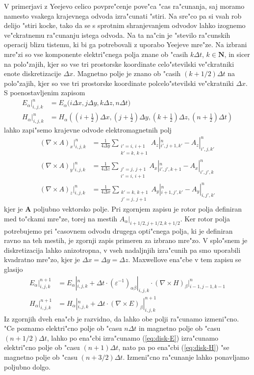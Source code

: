\documentclass[12pt,twoside,openright,final]{report}
\renewcommand{\vec}{\mathbf}
\begin{document}
V primerjavi z Yeejevo celico povpre"cenje pove"ca "cas ra"cunanja, saj moramo namesto vsakega krajevnega odvoda izra"cunati "stiri. 
Na sre"co pa si vsah rob delijo "stiri kocke, tako da se s sprotnim shranjevanjem odvodov lahko izognemo ve"ckratnemu ra"cunanju istega odvoda. 
Na ta na"cin je "stevilo ra"cunskih operacij blizu tistemu, ki bi ga potrebovali z uporabo Yeejeve mre"ze. Na izbrani mre"zi so vse komponente elektri"cnega polja znane ob "casih $k\Delta t$, $k\in\mathbf{N}$, in sicer na polo"zajih, kjer so vse tri prostorske koordinate celo"stevilski ve"ckratniki enote diskretizacije $\Delta x$. 
Magnetno polje je znano ob "casih $(k+1/2)\Delta t$ na polo"zajih, kjer so vse tri prostorske koordinate polcelo"stevilski ve"ckratniki $\Delta x$. 
S poenostavljenim zapisom
\begin{align}
 E_\alpha|_{i,j,k}^n &= E_\alpha\Big(i\Delta x, j\Delta y, k\Delta z, n \Delta t\Big) \\
 H_\alpha|_{i,j,k}^n &= H_\alpha\left(\left(i+\frac{1}{2}\right)\Delta x, \left(j+\frac{1}{2}\right)\Delta y, \left(k+\frac{1}{2}\right)\Delta z, \left(n+\frac{1}{2}\right) \Delta t\right)
\end{align}
lahko zapi"semo krajevne odvode elektromagnetnih polj
\newcommand{\sumij}[2]{\substack{ #1' = #1,\, #1+1 \\ #2' = #2,\, #2+1}}
\begin{align}
 \label{eq:diskretni-odvodi}
 (\nabla\times A)_x|_{i,j,k}^n &= \frac{1}{4\Delta y}\sum_{\sumij{i}{k}} A_z|_{i',j+1,k'}^{n} - A_z|_{i',j,k'}^{n} \\
 (\nabla\times A)_y|_{i,j,k}^n &= \frac{1}{4\Delta z}\sum_{\sumij{j}{i}} A_x|_{i',j',k+1}^{n} - A_x|_{i',j',k}^{n} \\
 (\nabla\times A)_z|_{i,j,k}^n &= \frac{1}{4\Delta x}\sum_{\sumij{k}{j}} A_y|_{i+1,j',k'}^{n} - A_y|_{i,j',k'}^{n}
\end{align}
kjer je $\vec A$ poljubno vektorsko polje. 
Pri zgornjem zapisu je rotor polja definiran med to"ckami mre"ze, torej na mestih $A_\alpha|_{i+1/2,j+1/2,k+1/2}$. 
Ker rotor polja potrebujemo pri "casovnem odvodu drugega opti"cnega polja, ki je definiran ravno na teh mestih, je zgornji zapis primeren za izbrano mre"zo. 
V splo"snem je diskretizacija lahko anizotropna, v vseh nadaljnjih izra"cunih pa smo uporabili kvadratno mre"zo, kjer je $\Delta x = \Delta y = \Delta z$. 
Maxwellove ena"cbe v tem zapisu se glasijo
\begin{align}
 E_\alpha|_{i,j,k}^{n+1} &= E_\alpha|_{i,j,k}^n + \Delta t \cdot (\varepsilon^{-1})_{\alpha\beta}|_{i,j,k} \cdot (\nabla\times H)_\beta|_{i-1,j-1,k-1}^{n} \label{eq:disk-E}\\
 H_\alpha|_{i,j,k}^{n+1} &= H_\alpha|_{i,j,k}^n + \Delta t \cdot (\nabla\times E)_\beta|_{i,j,k}^{n+1} \label{eq:disk-H}
\end{align}
Iz zgornjih dveh ena"cb je razvidno, da lahko obe polji ra"cunamo izmeni"cno. 
"Ce poznamo elektri"cno polje ob "casu $n\Delta t$ in magnetno polje ob "casu $(n+1/2)\Delta t$, lahko po ena"cbi izra"cunamo (\ref{eq:disk-E}) izra"cunamo elektri"cno polje ob "casu $(n+1)\Delta t$, nato pa po ena"cbi (\ref{eq:disk-H}) "se magnetno polje ob "casu $(n+3/2)\Delta t$. Izmeni"cno ra"cunanje lahko ponavljamo poljubno dolgo. 
\end{document}
